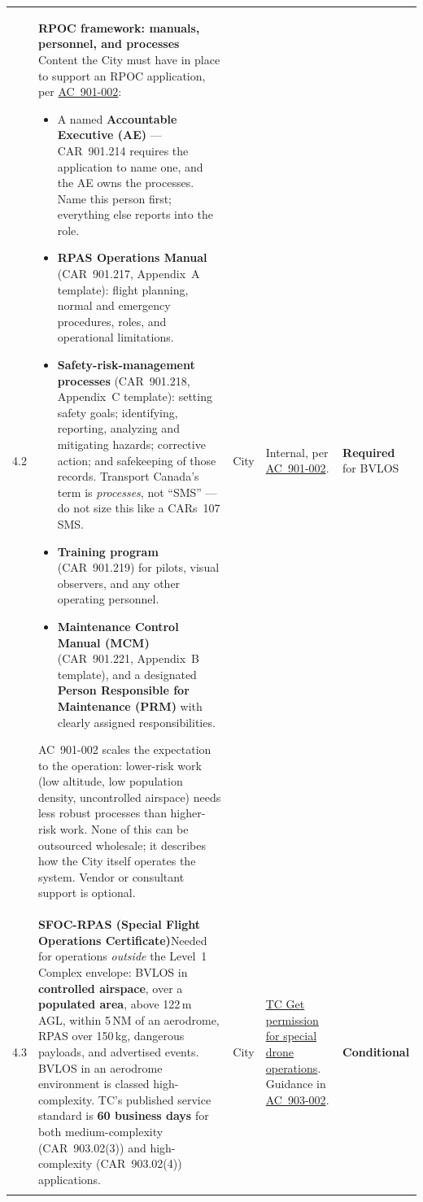 \documentclass[11pt,letterpaper]{article}
\newcommand{\itemrule}{\arrayrulecolor{uavrule}\midrule\arrayrulecolor{black}}
\newcommand{\reqcell}[2]{\textbf{#1}\newline\small\color{uavgrey}#2}
\newcommand{\req}{\textbf{\color{uavwarn!85!black}Required}}
\newcommand{\cond}{\textbf{\color{uavblue}Conditional}}
\begin{document}
\begin{longtable}{@{}L{0.28in} L{2.20in} L{0.85in} L{1.95in} L{0.85in}@{}}
4.2 &
{\textbf{RPOC framework: manuals, personnel, and processes}\newline
\small\color{uavgrey}%
Content the City must have in place to support an RPOC application, per
\href{https://tc.canada.ca/sites/default/files/2025-10/AC_901-002_issue_2.pdf}{AC~901-002}:
\begin{itemize}[leftmargin=1em, itemsep=1pt, topsep=2pt, parsep=0pt]
  \item A named \textbf{Accountable Executive (AE)} --- CAR~901.214
        requires the application to name one, and the AE owns the
        processes. Name this person first; everything else reports
        into the role.
  \item \textbf{RPAS Operations Manual} (CAR~901.217, Appendix~A
        template): flight planning, normal and emergency procedures,
        roles, and operational limitations.
  \item \textbf{Safety-risk-management processes} (CAR~901.218,
        Appendix~C template): setting safety goals; identifying,
        reporting, analyzing and mitigating hazards; corrective action;
        and safekeeping of those records. Transport Canada's term is
        \emph{processes}, not ``SMS'' --- do not size this like a
        CARs~107 SMS.
  \item \textbf{Training program} (CAR~901.219) for pilots, visual
        observers, and any other operating personnel.
  \item \textbf{Maintenance Control Manual (MCM)} (CAR~901.221,
        Appendix~B template), and a designated \textbf{Person
        Responsible for Maintenance (PRM)} with clearly assigned
        responsibilities.
\end{itemize}
AC~901-002 scales the expectation to the operation: lower-risk work
(low altitude, low population density, uncontrolled airspace) needs
less robust processes than higher-risk work. None of this can be
outsourced wholesale; it describes how the City itself operates the
system. Vendor or consultant support is optional.} &
City &
Internal, per \href{https://tc.canada.ca/en/aviation/reference-centre/advisory-circulars/advisory-circular-ac-no-901-002}{AC~901-002}. &
\req{} for BVLOS \\ \itemrule

4.3 &
\reqcell{SFOC-RPAS (Special Flight Operations Certificate)}{Needed for operations \emph{outside} the Level~1 Complex envelope: BVLOS in \textbf{controlled airspace}, over a \textbf{populated area}, above 122\,m AGL, within 5\,NM of an aerodrome, RPAS over 150\,kg, dangerous payloads, and advertised events. BVLOS in an aerodrome environment is classed high-complexity. TC's published service standard is \textbf{60 business days} for both medium-complexity (CAR~903.02(3)) and high-complexity (CAR~903.02(4)) applications.} &
City &
\href{https://tc.canada.ca/en/aviation/drone-safety/drone-pilot-licensing/get-permission-special-drone-operations}{TC Get permission for special drone operations}. Guidance in
\href{https://tc.canada.ca/en/aviation/reference-centre/advisory-circulars/advisory-circular-ac-no-903-002}{AC~903-002}. &
\cond{} \\ \itemrule


\end{longtable}
\end{document}
